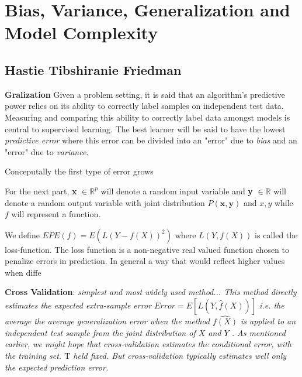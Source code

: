 
\section{Bias, Variance, Generalization and Model Complexity}

\subsection{Hastie Tibshiranie Friedman}

\textbf{Gralization}
Given a problem setting, it is said that an algorithm's predictive power relies on its ability to correctly label samples on independent test data. Measuring and comparing this ability to correctly label data amongst models is central to supervised learning.  The best learner will be said to have the lowest \textit{predictive error} where this error can be divided into an "error" due to \textit{bias} and an "error" due to \textit{variance}.

Conceputally the first type of error grows 


For the next part, \textbf{x} $\in \mathbb{R}^{p}$ will denote a random input variable and \textbf{y}  $\in \mathbb{R}$ will denote a random output variable with joint distribution $P\left(\textbf{x},\textbf{y}\right)$ and  $x,y$ while $f$ will represent a function. 

We define $EPE\left(f \right) = E\left(L\left(Y - f(X) \right)^2 \right)  $ where $L(Y,f\left(X\right))$ is called the loss-function. The loss function is a non-negative real valued function chosen to penalize errors in prediction. In general 
a way that would reflect higher values when diffe




\textbf{Cross Validation}:  
\textit{simplest and most widely used method... This method directly estimates the expected extra-sample error
$Error = E[L(Y,\hat{f}(X))] $ i.e. the average the average generalization error when the method $\hat{f(X)}$ is applied to an independent test sample from the joint distribution of $X$ and $Y$ . As mentioned earlier, we might hope that cross-validation estimates the conditional error, with the training set. $\mathrm{T}$ held fixed. But cross-validation typically estimates well only the expected prediction error.}

